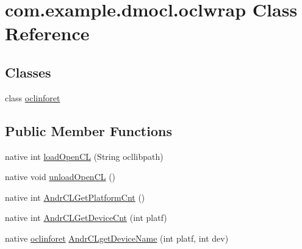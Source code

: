 \hypertarget{classcom_1_1example_1_1dmocl_1_1oclwrap}{}\section{com.\+example.\+dmocl.\+oclwrap Class Reference}
\label{classcom_1_1example_1_1dmocl_1_1oclwrap}
\subsection*{Classes}
\begin{DoxyCompactItemize}
\item 
class \mbox{\hyperlink{classcom_1_1example_1_1dmocl_1_1oclwrap_1_1oclinforet}{oclinforet}}
\end{DoxyCompactItemize}
\subsection*{Public Member Functions}
\begin{DoxyCompactItemize}
\item 
native int \mbox{\hyperlink{classcom_1_1example_1_1dmocl_1_1oclwrap_ac410aa241e771d4b1962636fa9f04e24}{load\+Open\+CL}} (String ocllibpath)
\item 
native void \mbox{\hyperlink{classcom_1_1example_1_1dmocl_1_1oclwrap_aa98cb05829d56c9bdc773eeda8911d2c}{unload\+Open\+CL}} ()
\item 
native int \mbox{\hyperlink{classcom_1_1example_1_1dmocl_1_1oclwrap_ae24bb606cc482ba27e0dbdca97b377ea}{Andr\+C\+L\+Get\+Platform\+Cnt}} ()
\item 
native int \mbox{\hyperlink{classcom_1_1example_1_1dmocl_1_1oclwrap_a32be75820f34934e226d5ab0db569aa7}{Andr\+C\+L\+Get\+Device\+Cnt}} (int platf)
\item 
native \mbox{\hyperlink{classcom_1_1example_1_1dmocl_1_1oclwrap_1_1oclinforet}{oclinforet}} \mbox{\hyperlink{classcom_1_1example_1_1dmocl_1_1oclwrap_aa4f6d9eb5e580ebc687ccd3a518abb2c}{Andr\+C\+Lget\+Device\+Name}} (int platf, int dev)
\end{DoxyCompactItemize}
